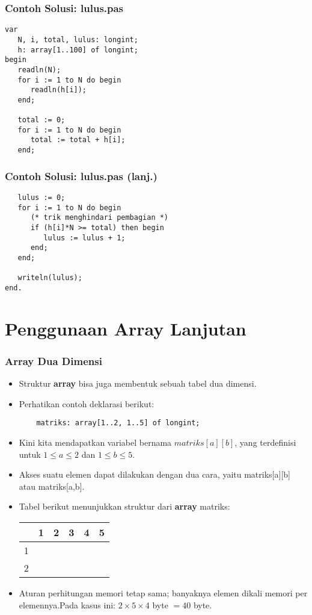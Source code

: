 \documentclass{beamer}
\begin{document}
\begin{frame}[fragile]
\frametitle{Contoh Solusi: lulus.pas}
\begin{lstlisting}
var
   N, i, total, lulus: longint;
   h: array[1..100] of longint;
begin
   readln(N);
   for i := 1 to N do begin
      readln(h[i]);
   end;

   total := 0;
   for i := 1 to N do begin
      total := total + h[i];
   end;
\end{lstlisting}
\end{frame}

\begin{frame}[fragile]
\frametitle{Contoh Solusi: lulus.pas (lanj.)}
\begin{lstlisting}
   lulus := 0;
   for i := 1 to N do begin
      (* trik menghindari pembagian *)
      if (h[i]*N >= total) then begin 
         lulus := lulus + 1;
      end;
   end;

   writeln(lulus);
end.
\end{lstlisting}
\end{frame}

\section{Penggunaan Array Lanjutan}
\frame{\sectionpage}

\begin{frame}[fragile]
\frametitle{Array Dua Dimensi}
\begin{itemize}
	\item Struktur \textbf{array} bisa juga membentuk sebuah tabel dua dimensi.
	\item Perhatikan contoh deklarasi berikut:
	\begin{lstlisting}
	matriks: array[1..2, 1..5] of longint;
	\end{lstlisting}
	\item Kini kita mendapatkan variabel bernama $matriks[a][b]$, yang terdefinisi untuk $1 \le a \le 2$ dan $1 \le b \le 5$.
	\item Akses suatu elemen dapat dilakukan dengan dua cara, yaitu matriks[a][b] atau matriks[a,b].
	\item Tabel berikut menunjukkan struktur dari \textbf{array} matriks:
	\begin{table}[h]
		\begin{tabular}{c|c|c|c|c|c|}
			  & 1 & 2 & 3 & 4 & 5\\ 
			\hline 1 & & & & & \\ 
			\hline 2 & & & & & \\ 
			\hline
		\end{tabular}
	\end{table}  
	\item Aturan perhitungan memori tetap sama; banyaknya elemen dikali memori per elemennya.\newline Pada kasus ini: $2 \times 5 \times 4$ byte $= 40$ byte.
\end{itemize}
\end{frame}
\end{document}
